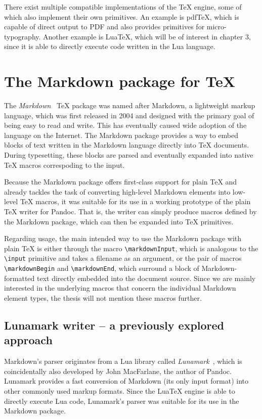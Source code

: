 \documentclass[
  digital,     %
  oneside,     %
  nosansbold,  %
  nocolorbold, %
  lof,         %
  lot,         %
]{fithesis4}
\newcommand{\macro}[1]{\texttt{\textbackslash{}{#1}}}
\begin{document}
There exist multiple compatible implementations of the \TeX{} engine, some of which also implement their own primitives. An example is pdf\TeX{}, which is capable of direct output to PDF and also provides primitives for micro-typography. Another example is Lua\TeX{}, which will be of interest in chapter 3, since it is able to directly execute code written in the Lua language.

\section{The Markdown package for \TeX{}}
The \emph{Markdown}~\cite{cstug-markdown} \TeX{} package was named after Markdown, a lightweight markup language, which was first released in 2004 and designed with the primary goal of being easy to read and write. This has eventually caused wide adoption of the language on the Internet. The Markdown package provides a way to embed blocks of text written in the Markdown language directly into \TeX{} documents. During typesetting, these blocks are parsed and eventually expanded into native \TeX{} macros correspoding to the input. 

Because the Markdown package offers first-class support for plain \TeX{} and already tackles the task of converting high-level Markdown elements into low-level \TeX{} macros, it was suitable for its use in a working prototype of the plain \TeX{} writer for Pandoc. That is, the writer can simply produce macros defined by the Markdown package, which can then be expanded into \TeX{} primitives.

Regarding usage, the main intended way to use the Markdown package with plain \TeX{} is either through the macro \macro{markdownInput}, which is analogous to the \macro{input} primitive and takes a filename as an argument, or the pair of macros \macro{markdownBegin} and \macro{markdownEnd}, which surround a block of Markdown-formatted text directly embedded into the document source. Since we are mainly interested in the underlying macros that concern the individual Markdown element types, the thesis will not mention these macros further.

\subsection{Lunamark writer -- a previously explored approach}
Markdown's parser originates from a Lua library called \emph{Lunamark}~\cite{lunamark}, which is coincidentally also developed by John MacFarlane, the author of Pandoc. Lunamark provides a fast conversion of Markdown (its only input format) into other commonly used markup formats. Since the Lua\TeX{} engine is able to directly execute Lua code, Lunamark's parser was suitable for its use in the Markdown package.
\end{document}
